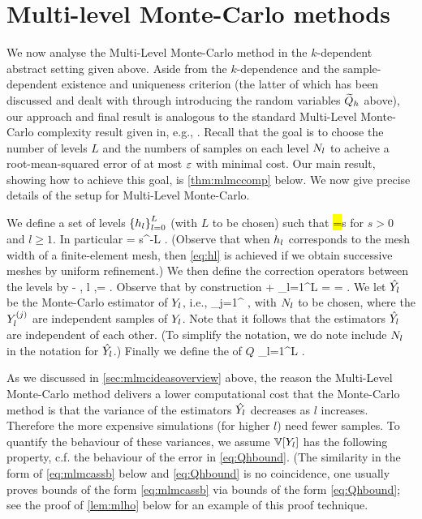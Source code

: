\section{Multi-level Monte-Carlo methods}\label{sec:mlmcan}
We now analyse the Multi-Level Monte-Carlo method in the $k$-dependent abstract setting given above. Aside from the $k$-dependence and the sample-dependent existence and uniqueness criterion (the latter of which has been discussed and dealt with through introducing the random variables $\widetilde{Q}_{h}$ above), our approach and final result is analogous to the standard Multi-Level Monte-Carlo complexity result given in, e.g., \cite[Theorem 1]{ClGiScTe:11}. Recall that the goal is to choose the number of levels $L$ and the numbers of samples on each level $N_{l}$ to acheive a root-mean-squared error of at most $\varepsilon$ with minimal cost. Our main result, showing how to achieve this goal, is \cref{thm:mlmccomp} below. We now give precise details of the setup for Multi-Level Monte-Carlo.

We define a set of levels $\set{\hl}_{l=0}^L$ (with $L$ to be chosen) such that
\beq\label{eq:hl}
\hl =\frac{\hlmo}s
\eeq
for $s > 0$ and $l \geq 1$. In particular
\beq\label{eq:hL}
\hL = s^{-L} \hz.
\eeq
(Observe that when $h_{l}$ corresponds to the mesh width of a finite-element mesh, then \cref{eq:hl} is achieved if we obtain successive meshes by uniform refinement.) We then define the correction operators between the levels by
\beqs
\Yl \de \Qhltilde - \Qhlmotilde, l ,\quad \Yz = \Qhztilde.
\eeqs
Observe that by construction
\beq\label{eq:expectationtelescope}
\EXP{\Yz} + \sum_{l=1}^L \EXP{\Yl} =  = \EXP{\QhLtilde}.
\eeq
We let $\hat{Y_{l}}$ be the Monte-Carlo estimator of $Y_{l}$, i.e.,
 \beqs
\Ylhat \de {}\sum_{j=1}^{\Nl} \Ylj,
 \eeqs
 with $N_{l}$ to be chosen, where the $Y_{l}^{(j)}$ are independent samples of $Y_{l}$. Note that it follows that the estimators $\hat{Y_{l}}$ are independent of each other. (To simplify the notation, we do note include $N_{l}$ in the notation for $\hat{Y_{l}}$.) Finally we define the  of $Q$
 \beqs
 \QhatMLhL \de \sum_{l=1}^L \Ylhat.
 \eeqs

 As we discussed in \cref{sec:mlmcideasoverview} above, the reason the Multi-Level Monte-Carlo method delivers a lower computational cost that the Monte-Carlo method is that the variance of the estimators $\hat{Y_{l}}$ decreases as $l$ increases. Therefore the more expensive simulations (for higher $l$) need fewer samples. To quantify the behaviour of these variances, we assume $\VAR{\Yl}$ has the following property, c.f. the behaviour of the error in \cref{eq:Qhbound}. (The similarity in the form of \cref{eq:mlmcassb} below and \cref{eq:Qhbound} is no coincidence, one usually proves bounds of the form \cref{eq:mlmcassb} via bounds of the form \cref{eq:Qhbound}; see the proof of \cref{lem:mlho} below for an example of this proof technique.

